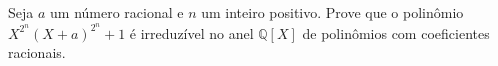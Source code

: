 Seja \(a\) um número racional e \(n\) um inteiro positivo. Prove que o polinômio \(X^{2^n}(X+a)^{2^n}+1\) é irreduzível no anel \(\mathbb{Q}[X]\) de polinômios com coeficientes racionais.
